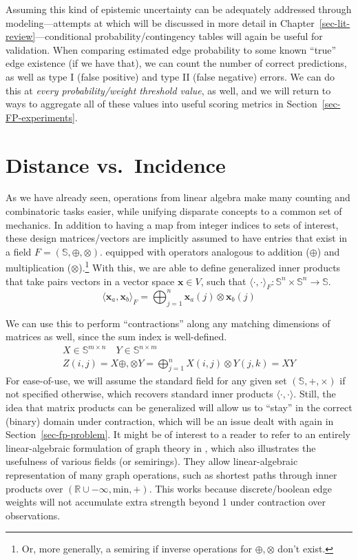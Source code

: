 \documentclass[%
	12pt,
		oneside,
		letterpaper
]{book}
\begin{document}
Assuming this kind of epistemic uncertainty can be adequately addressed through modeling---attempts at which will be discussed in more detail in Chapter~\ref{sec-lit-review}---conditional probability/contingency tables will again be useful for validation.
When comparing estimated edge probability to some known ``true'' edge existence (if we have that), we can count the number of correct predictions, as well as type I (false positive) and type II (false negative) errors.
We can do this at \emph{every probability/weight threshold value}, as well, and we will return to ways to aggregate all of these values into useful scoring metrics in Section~\ref{sec-FP-experiments}.

\section{Distance vs.~Incidence}\label{sec-products}

As we have already seen, operations from linear algebra make many counting and combinatoric tasks easier, while unifying disparate concepts to a common set of mechanics.
In addition to having a map from integer indices to sets of interest, these design matrices/vectors are implicitly assumed to have entries that exist in a field \(F=(\mathbb{S},\oplus,\otimes)\).
equipped with operators analogous to addition (\(\oplus\)) and multiplication (\(\otimes\)).\footnote{
  Or, more generally, a semiring if inverse operations for \(\oplus,\otimes\) don't exist.}
With this, we are able to define generalized inner products that take pairs vectors in a vector space \(\mathbf{x}\in V\), such that \(\langle\cdot,\cdot\rangle_F:\mathbb{S}^n\times \mathbb{S}^n\rightarrow \mathbb{S}\).
\[
\langle\mathbf{x}_a,\mathbf{x}_b\rangle_{F} = \bigoplus_{j=1}^n \mathbf{x}_a(j)\otimes\mathbf{x}_b(j)
\]

We can use this to perform ``contractions'' along any matching dimensions of matrices as well, since the sum index is well-defined.
\[
\begin{aligned}
X\in\mathbb{S}^{m\times n}\quad Y\in\mathbb{S}^{n\times m} \\
Z(i,j)=X\oplus,\otimes Y = \bigoplus_{j=1}^{n} X(i,j) \otimes Y(j,k) = XY
\end{aligned}
\]
For ease-of-use, we will assume the standard field for any given set \((\mathbb{S},+,\times)\) if not specified otherwise, which recovers standard inner products \(\langle\cdot,\cdot\rangle\).
Still, the idea that matrix products can be generalized will allow us to ``stay'' in the correct (binary) domain under contraction, which will be an issue dealt with again in Section~\ref{sec-fp-problem}.
It might be of interest to a reader to refer to an entirely linear-algebraic formulation of graph theory in \textcite{MathematicalfoundationsGraphBLAS_Kepner2016}, which also illustrates the usefulness of various fields (or semirings).
They allow linear-algebraic representation of many graph operations, such as shortest paths through inner products over \((\mathbb{R}\cup -\infty,\textrm{min}, +)\).
This works because discrete/boolean edge weights will not accumulate extra strength beyond 1 under contraction over observations.
\end{document}
